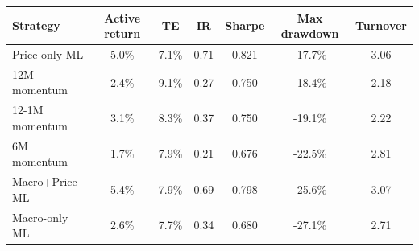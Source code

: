\begin{tabular}{lcccccc}
\toprule
\textbf{Strategy} & \textbf{Active return} & \textbf{TE} & \textbf{IR} & \textbf{Sharpe} & \textbf{Max drawdown} & \textbf{Turnover} \\
\midrule
Price-only ML & 5.0\% & 7.1\% & 0.71 & 0.821 & -17.7\% & 3.06 \\
12M momentum & 2.4\% & 9.1\% & 0.27 & 0.750 & -18.4\% & 2.18 \\
12-1M momentum & 3.1\% & 8.3\% & 0.37 & 0.750 & -19.1\% & 2.22 \\
6M momentum & 1.7\% & 7.9\% & 0.21 & 0.676 & -22.5\% & 2.81 \\
Macro+Price ML & 5.4\% & 7.9\% & 0.69 & 0.798 & -25.6\% & 3.07 \\
Macro-only ML & 2.6\% & 7.7\% & 0.34 & 0.680 & -27.1\% & 2.71 \\
\bottomrule
\end{tabular}